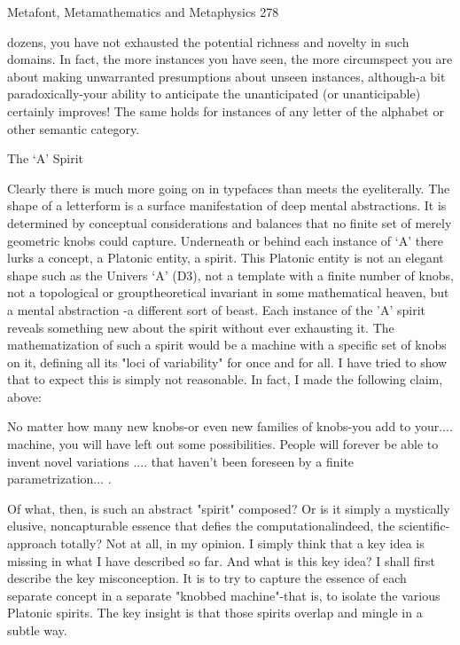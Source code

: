 Metafont, Metamathematics and Metaphysics                                               278

dozens, you have not exhausted the potential richness and novelty in such domains. In
fact, the more instances you have seen, the more circumspect you are about making
unwarranted presumptions about unseen instances, although-a bit paradoxically-your
ability to anticipate the unanticipated (or unanticipable) certainly improves! The same
holds for instances of any letter of the alphabet or other semantic category.

                                       The `A' Spirit

        Clearly there is much more going on in typefaces than meets the eyeliterally. The
shape of a letterform is a surface manifestation of deep mental abstractions. It is
determined by conceptual considerations and balances that no finite set of merely
geometric knobs could capture. Underneath or behind each instance of `A' there lurks a
concept, a Platonic entity, a spirit. This Platonic entity is not an elegant shape such as the
Univers `A' (D3), not a template with a finite number of knobs, not a topological or
grouptheoretical invariant in some mathematical heaven, but a mental abstraction -a
different sort of beast. Each instance of the 'A' spirit reveals something new about the
spirit without ever exhausting it. The mathematization of such a spirit would be a
machine with a specific set of knobs on it, defining all its "loci of variability" for once
and for all. I have tried to show that to expect this is simply not reasonable. In fact, I
made the following claim, above:

   No matter how many new knobs-or even new families of knobs-you add to your....
   machine, you will have left out some possibilities. People will forever be able to
   invent novel variations .... that haven't been foreseen by a finite parametrization... .

        Of what, then, is such an abstract "spirit" composed? Or is it simply a mystically
elusive, noncapturable essence that defies the computationalindeed, the scientific-
approach totally? Not at all, in my opinion. I simply think that a key idea is missing in
what I have described so far. And what is this key idea? I shall first describe the key
misconception. It is to try to capture the essence of each separate concept in a separate
"knobbed machine"-that is, to isolate the various Platonic spirits. The key insight is that
those spirits overlap and mingle in a subtle way.

